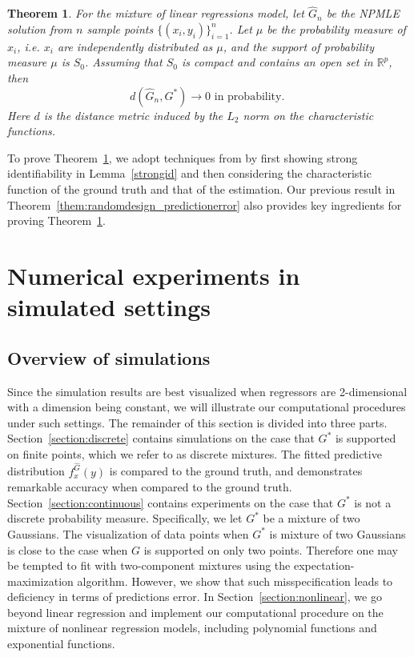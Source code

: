 \documentclass[11pt]{article}
\numberwithin{equation}{section}
\newtheorem{theorem}{Theorem}[section]
\newcommand{\RS}{\mathbb{R}}
\newcommand{\EM}{expectation-maximization }
\begin{document}
\begin{theorem}
For the mixture of linear regressions model, let $\hat{G}_n$ be the NPMLE solution from $n$ sample points $\{ (x_i,y_i)\}_{i=1}^n$. Let  $\mu$ be the probability measure of $x_i$, i.e. $x_i$ are independently distributed as $\mu$, and the support of probability measure $\mu$ is $S_0$. Assuming that $S_0$ is compact and contains an open set in $\RS^p$, then 
\[
d(\hat{G}_n, G^*)\rightarrow 0 \text{ in probability. }
\]
Here $d$ is the distance metric induced by the $L_2$ norm on the characteristic functions.
\label{thm:weakconsistency}
\end{theorem}

To prove Theorem~\ref{thm:weakconsistency}, we adopt techniques from \citet{beran1994minimum} by first showing  strong identifiability in Lemma~\ref{strongid} and then considering the characteristic function of the ground truth and that of the estimation. Our previous result in Theorem~\ref{them:randomdesign_predictionerror} also provides key ingredients for proving Theorem~\ref{thm:weakconsistency}.

\section{Numerical experiments in simulated settings}
\label{section:simulateddata}

\subsection{Overview of simulations}

Since the simulation results are best visualized when regressors are 2-dimensional with a dimension being constant, we will illustrate our computational procedures under such settings. The remainder of this section is divided into three parts. Section~\ref{section:discrete} contains simulations on the case that $G^*$ is supported on finite points, which we refer to as discrete mixtures. The fitted predictive distribution $f^{\hat{G}}_x(y)$ is compared to the ground truth, and demonstrates remarkable accuracy when compared to the ground truth. Section~\ref{section:continuous} contains experiments on the case that $G^*$ is not a discrete probability measure. Specifically, we let $G^*$ be a mixture of two Gaussians. The visualization of data points when $G^*$ is mixture of two Gaussians is close to the case when $G$ is supported on only two points. Therefore one may be tempted to fit with two-component mixtures using the \EM algorithm. However, we show that such misspecification leads to deficiency in terms of predictions error. In Section~\ref{section:nonlinear}, we go beyond linear regression and implement our computational procedure on the mixture of nonlinear regression models,  including polynomial functions and exponential functions.                                                                                                                                                                                                                             
\end{document}
